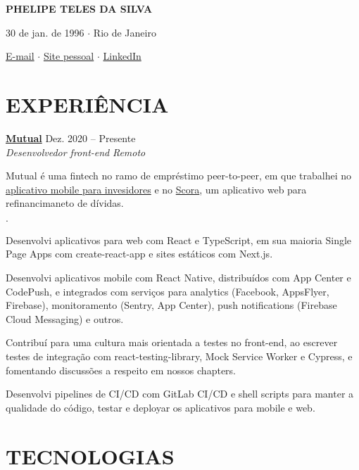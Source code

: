\documentclass[12pt]{article}
\newenvironment{tightlist}
  {\begin{list}
    {$\cdot$}
    {
      \setlength{\leftmargin}{0em}
      \setlength{\itemsep}{\smallskipamount}
    }
  }
{\end{list}}
\begin{document}
\pagestyle{empty}

\centerline{\huge\bf PHELIPE TELES DA SILVA}
\medskip

\centerline{30 de jan. de 1996 $\cdot$ Rio de Janeiro}
\smallskip

\centerline{
  \href{mailto:telesphelipe@gmail.com}{ E-mail}
  $\cdot$
  \href{https://phelipetls.github.io}{ Site pessoal}
  $\cdot$
  \href{https://linkedin.com/in/phelipeteles}{ LinkedIn}
}
\smallskip

\section*{EXPERIÊNCIA}

\textbf{\href{https://mutual.club}{Mutual}} \hfill Dez. 2020 -- Presente \\
\textit{Desenvolvedor front-end} \hfill \textit{Remoto} {\parfillskip=0pt\par}

Mutual é uma fintech no ramo de empréstimo peer-to-peer, em que trabalhei no
\href{https://mutual.club/en/invest.html}{aplicativo mobile para invesidores} e
no \href{https://scora.com.br/}{Scora}, um aplicativo web para refinancimaneto
de dívidas.

\begin{tightlist}
  \item Desenvolvi aplicativos para web com React e TypeScript, em sua maioria
    Single Page Apps com create-react-app e sites estáticos com Next.js.
  \item Desenvolvi aplicativos mobile com React Native, distribuídos com App
    Center e CodePush, e integrados com serviços para analytics (Facebook,
    AppsFlyer, Firebase), monitoramento (Sentry, App Center), push notifications
    (Firebase Cloud Messaging) e outros.
  \item Contribuí para uma cultura mais orientada a testes no front-end, ao
    escrever testes de integração com react-testing-library, Mock Service Worker
    e Cypress, e fomentando discussões a respeito em nossos chapters.
  \item Desenvolvi pipelines de CI/CD com GitLab CI/CD e shell scripts para
    manter a qualidade do código, testar e deployar os aplicativos para mobile e
    web.
\end{tightlist}

\section*{TECNOLOGIAS}
\end{document}
